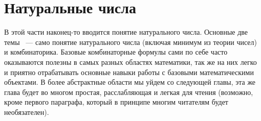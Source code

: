 \documentclass[a5paper,10pt,pagesize,DIV=classic]{scrbook}
\theoremstyle{plain}
\theoremstyle{definition}
\begin{document}









\chapter{Натуральные числа}
В этой части наконец-то вводится понятие натурального числа. Основные две темы ~--- само понятие натурального числа (включая минимум из теории чисел) и комбинаторика. Базовые комбинаторные формулы сами по себе часто оказываются полезны в самых разных областях математики, так же на них легко и приятно отрабатывать основные навыки работы с базовыми математическими объектами. В более абстрактные области мы уйдем со следующей главы, эта же глава будет во многом простая, расслабляющая и легкая для чтения (возможно, кроме первого параграфа, который в принципе многим читателям будет необязателен).





\end{document}
